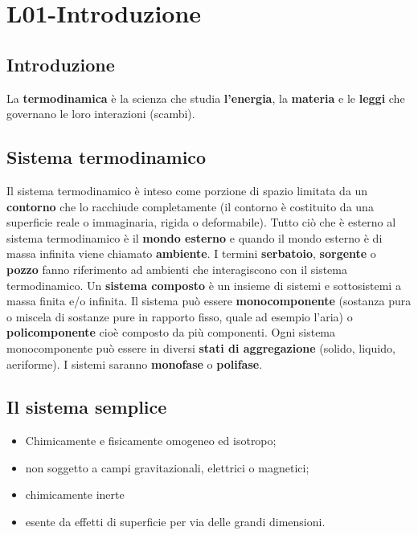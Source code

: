 \section{L01-Introduzione}
\subsection{Introduzione}
La \textbf{termodinamica} è la scienza che studia \textbf{l’energia}, la \textbf{materia} e le \textbf{leggi} che governano le loro interazioni (scambi).
\subsection{Sistema termodinamico}
Il sistema termodinamico è inteso come porzione di spazio limitata da un \textbf{contorno} che lo racchiude completamente (il contorno è costituito da una superficie reale o immaginaria, rigida o deformabile).\newline
\newline
Tutto ciò che è esterno al sistema termodinamico è il \textbf{mondo esterno} e quando il mondo esterno è di massa infinita viene chiamato \textbf{ambiente}.\newline
\newline
I termini \textbf{serbatoio}, \textbf{sorgente} o \textbf{pozzo} fanno riferimento ad ambienti che interagiscono con il sistema termodinamico.\newline
\newline
Un \textbf{sistema composto} è un insieme di sistemi e sottosistemi a massa finita e/o infinita.\newline
\newline
Il sistema può essere \textbf{monocomponente} (sostanza pura o miscela di sostanze pure in rapporto fisso, quale ad esempio l'aria) o \textbf{policomponente} cioè composto da più componenti.\newline
\newline
Ogni sistema monocomponente può essere in diversi \textbf{stati di aggregazione} (solido, liquido, aeriforme). I sistemi saranno \textbf{monofase} o \textbf{polifase}.
\subsection{Il sistema semplice}
\begin{itemize}
    \item Chimicamente e fisicamente omogeneo ed isotropo;
    \item non soggetto a campi gravitazionali, elettrici o magnetici;
    \item chimicamente inerte
    \item esente da effetti di superficie per via delle grandi dimensioni.
\end{itemize}
